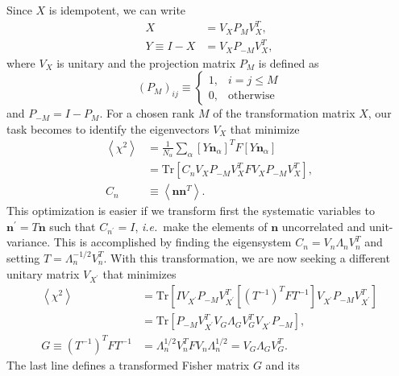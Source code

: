 \documentclass[linenumbers, onecolumn]{aastex63}
\newcommand{\ie}{\textit{i.e.}}
\newcommand{\vecn}{\ensuremath{\mathbf{n}}}
\newcommand{\covm}{C}
\newcommand{\matF}{F}
\newcommand{\matG}{G}
\newcommand{\matI}{I}
\newcommand{\matT}{T}
\newcommand{\matX}{X}
\newcommand{\matY}{Y}
\newcommand{\matV}{V}
\newcommand{\matLam}{\Lambda}
\newcommand{\proj}{P}  %
\newcommand{\trace}{\text{Tr}}
\begin{document}
Since $\matX$ is idempotent, we can write
\begin{align}
  \matX & = V_X \proj_M V_X^T, \\
  \matY \equiv \matI-\matX & = V_X \proj_{-M} V_X^T,
\end{align}
where $V_X$ is unitary and the projection matrix $\proj_M$ is defined as
\begin{equation}
  \left(\proj_M\right)_{ij} \equiv
\begin{cases}
                                            1,  &  i=j\le M \\
                                            0,  & \text{otherwise}
\end{cases}
\end{equation}
and $\proj_{-M}=\matI-\proj_M.$  For a chosen rank $M$ of the
transformation matrix $X$, our task becomes to identify the
eigenvectors $V_X$ that minimize
\begin{align}
  \left\langle \chi^2\right\rangle & = \frac{1}{N_\alpha} \sum_\alpha
  \left[ \matY \vecn_\alpha\right]^T \matF  \left[\matY
                                     \vecn_\alpha\right] \\
       & = \trace \left[ \covm_n V_X \proj_{-M} V_X^T \matF V_X
         \proj_{-M} V_X^T \right], \\
  C_n & \equiv \left\langle \vecn \vecn^T \right\rangle.
\end{align}
This optimization is easier if we transform first the systematic variables to
$\vecn^\prime =\matT\vecn$ such that $\covm_{n^\prime}=\matI$, \ie\
make the elements of $\vecn$ uncorrelated and unit-variance.  This
is accomplished by finding the eigensystem $\covm_n=\matV_n \matLam_n
\matV_n^T$ and setting $\matT = \matLam_n^{-1/2} \matV_n^T$.  With
this transformation, we are now seeking a different unitary matrix
$\matV_{X^\prime}$ that minimizes
\begin{align}
  \left\langle \chi^2\right\rangle & = \trace \left[ \matI
    V_{X^\prime} \proj_{-M} V_{X^\prime}^T \left[ (T^{-1})^T \matF
      T^{-1} \right] V_{X^\prime} 
    \proj_{-M} V_{X^\prime}^T \right] \\
  & = \trace \left[ \proj_{-M} V_{X^\prime}^T \matV_G \matLam_G \matV_G^T
    V_{X^\prime} \proj_{-M} \right],
  \label{eq:mintr}\\
  \matG \equiv \left(T^{-1}\right)^T \matF   T^{-1} & = \matLam_n^{1/2} \matV_n^T
  \matF \matV_n \matLam_n^{1/2} = \matV_G \matLam_G \matV_G^T.
  \label{eq:defG}
\end{align}
The last line defines a transformed Fisher matrix $\matG$ and its
\end{document}
